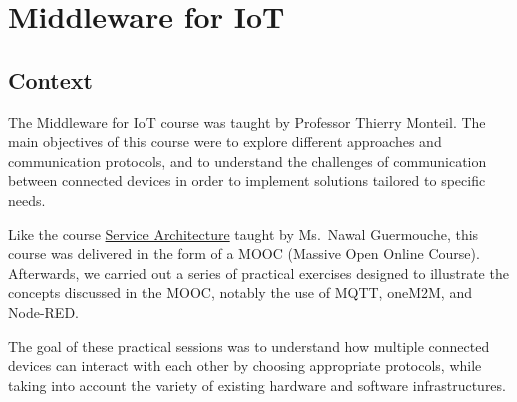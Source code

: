 


\section{Middleware for IoT}
\subsection{Context}
\indent \indent The Middleware for IoT course was taught by Professor Thierry Monteil. The main objectives of this course were to explore different approaches and communication protocols, and to understand the challenges of communication between connected devices in order to implement solutions tailored to specific needs.
\vspace{0.25cm}

\noindent Like the course \hyperref[sec:service_architecture]{Service Architecture} taught by Ms.\ Nawal Guermouche, this course was delivered in the form of a MOOC (Massive Open Online Course). Afterwards, we carried out a series of practical exercises designed to illustrate the concepts discussed in the MOOC, notably the use of MQTT, oneM2M, and Node-RED.
\vspace{0.25cm}

\noindent The goal of these practical sessions was to understand how multiple connected devices can interact with each other by choosing appropriate protocols, while taking into account the variety of existing hardware and software infrastructures.

